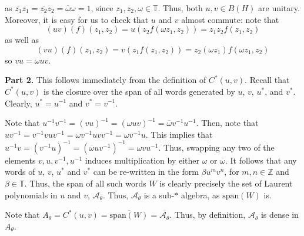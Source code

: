 \documentclass[aps,pra,showpacs,notitlepage,onecolumn,superscriptaddress,nofootinbib]{revtex4-1}
\theoremstyle{definition}
\begin{document}
    as $\overline{z_1} z_1 = \overline{z_2} z_2 = \overline{\omega} \omega = 1$, since $z_1, z_2, \omega \in \mathbb{T}$. Thus, both $u, v \in B(H)$ are unitary.
    Moreover, it is easy for us to check that $u$ and $v$ almost commute: note that
    \begin{equation}
      (uv)(f)(z_1, z_2) = u \left( z_2 f(\omega z_1, z_2) \right) = z_1 z_2 f(z_1, z_2)
    \end{equation}
    as well as
    \begin{equation}
      (vu)(f)(z_1, z_2) = v \left( z_1 f(z_1, z_2) \right) = z_2 (\omega z_1) f(\omega z_1, z_2)
    \end{equation}
    so $vu = \omega uv$.
    \newline

    \noindent \textbf{Part 2.} This follows immediately from the definition of $C^{*}(u, v)$. Recall that $C^{*}(u, v)$ is the closure over the span of all words generated by $u$, $v$, $u^{*}$, and $v^{*}$.
    Clearly, $u^{*} = u^{-1}$ and $v^{*} = v^{-1}$.

    Note that $u^{-1} v^{-1} = (vu)^{-1} = (\omega uv)^{-1} = \overline{\omega} v^{-1} u^{-1}$. Then, note that $u v^{-1} = v^{-1} v u v^{-1} = \omega v^{-1} u v v^{-1} = \omega v^{-1} u$. This implies that $u^{-1} v = (v^{-1} u)^{-1} = (\overline{\omega} u v^{-1})^{-1} = \omega v u^{-1}$.
    Thus, swapping any two of the elements $v, u, v^{-1}, u^{-1}$ induces multiplication by either $\omega$ or $\overline{\omega}$. It follows that any words of $u$, $v$, $u^{*}$ and $v^{*}$ can be re-written in the form $\beta u^{m} v^{n}$, for $m, n \in \mathbb{Z}$
    and $\beta \in \mathbb{T}$. Thus, the span of all such words $W$ is clearly precisely the set of Laurent polynomials in $u$ and $v$, $\mathcal{A}_{\theta}$. Thus, $\mathcal{A}_{\theta}$ is a sub-$*$ algebra, as $\text{span}(W)$ is.
    \newline

    \noindent Note that $A_{\theta} = C^{*}(u, v) = \overline{\text{span}(W)} = \overline{\mathcal{A}_{\theta}}$. Thus, by definition, $\mathcal{A}_{\theta}$ is dense in $A_{\theta}$.
    \newline
\end{document}
